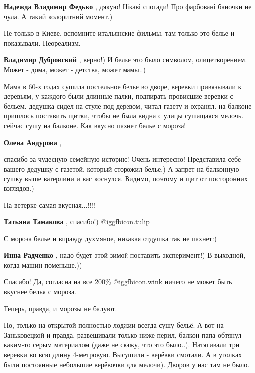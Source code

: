 \begin{itemize}
\begin{itemize} %
\textbf{Надежда Владимир Федько} , дякую! Цікаві спогади! Про фарбовані баночки не чула. А такий колоритний момент.)
\end{itemize} %

Не только в Киеве, вспомните итальянские фильмы, там только это белье и показывали. Неореализм.

\begin{itemize} %
\textbf{Владимир Дубровский} , верно!) И белье это было символом, олицетворением. Может - дома, может - детства, может мамы..)
\end{itemize} %


Мама в 60-х годах сушила постельное белье во дворе, веревки привязывали к
деревьям, у каждого были длинные палки, подпирать провисшие веревки с
бельем. дедушка сидел на стуле под деревом, читал газету и охранял. на балконе
пришлось поставить щитки, чтобы не была видна с улицы сушащаяся мелочь. сейчас
сушу на балконе. Как вкусно пахнет белье с мороза!

\begin{itemize} %
\textbf{Олена Андурова} , 

спасибо за чудесную семейную историю! Очень интересно! Представила себе вашего
дедушку с газетой, который сторожил белье.) А запрет на балконную сушку выше
ватерлини и вас коснулся. Видимо, поэтому и щит от посторонних взглядов.)

\end{itemize} %

На ветерке самая вкусная...!!!!

\textbf{Татьяна Тамакова} , спасибо!)  @igg{fbicon.tulip} 

С мороза белье и вправду духмяное, никакая отдушка так не пахнет:)

\textbf{Инна Радченко} , надо будет этой зимой поставить эксперимент!) В выходной, когда машин поменьше.))


Спасибо! Да, согласна на все 200\% @igg{fbicon.wink}  ничего не может быть вкуснее белья с мороза.

Теперь, правда, и морозы не балуют.

Но, только на открытой полностью лоджии всегда сушу бельё. А вот на
Заньковецкой и правда, развешивали только ниже перил, балкон папа обтянул
каким-то серым материалом (даже не скажу, что это было..). Натягивали три
веревки во всю длину 4-метровую. Высушили - верёвки смотали. А в уголках были
постоянные небольшие верёвочки для мелочи). Дворов у нас там не было.


\end{itemize}
